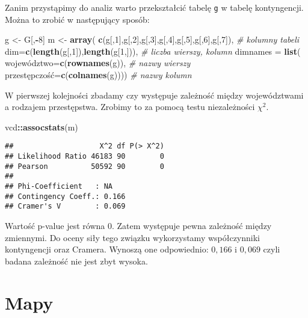 \documentclass[polish,]{book}
\newenvironment{Shaded}{\begin{snugshade}}{\end{snugshade}}
\newcommand{\CommentTok}[1]{\textcolor[rgb]{0.56,0.35,0.01}{\textit{#1}}}
\newcommand{\DataTypeTok}[1]{\textcolor[rgb]{0.13,0.29,0.53}{#1}}
\newcommand{\DecValTok}[1]{\textcolor[rgb]{0.00,0.00,0.81}{#1}}
\newcommand{\KeywordTok}[1]{\textcolor[rgb]{0.13,0.29,0.53}{\textbf{#1}}}
\newcommand{\NormalTok}[1]{#1}
\newcommand{\OperatorTok}[1]{\textcolor[rgb]{0.81,0.36,0.00}{\textbf{#1}}}
\newcommand{\StringTok}[1]{\textcolor[rgb]{0.31,0.60,0.02}{#1}}
\begin{document}
Zanim przystąpimy do analiz warto przekształcić tabelę \texttt{g} w tabelę kontyngencji.
Można to zrobić w następujący sposób:

\begin{Shaded}
\begin{Highlighting}[]
\NormalTok{g <-}\StringTok{ }\NormalTok{G[,}\OperatorTok{-}\DecValTok{8}\NormalTok{]}
\NormalTok{m <-}\StringTok{ }\KeywordTok{array}\NormalTok{(}
  \KeywordTok{c}\NormalTok{(g[,}\DecValTok{1}\NormalTok{],g[,}\DecValTok{2}\NormalTok{],g[,}\DecValTok{3}\NormalTok{],g[,}\DecValTok{4}\NormalTok{],g[,}\DecValTok{5}\NormalTok{],g[,}\DecValTok{6}\NormalTok{],g[,}\DecValTok{7}\NormalTok{]), }\CommentTok{# kolumny tabeli}
  \DataTypeTok{dim=}\KeywordTok{c}\NormalTok{(}\KeywordTok{length}\NormalTok{(g[,}\DecValTok{1}\NormalTok{]),}\KeywordTok{length}\NormalTok{(g[}\DecValTok{1}\NormalTok{,])),           }\CommentTok{# liczba wierszy, kolumn}
  \DataTypeTok{dimnames =} \KeywordTok{list}\NormalTok{(}
\NormalTok{    województwo=}\KeywordTok{c}\NormalTok{(}\KeywordTok{rownames}\NormalTok{(g)),    }\CommentTok{# nazwy wierszy}
\NormalTok{    przestępczość=}\KeywordTok{c}\NormalTok{(}\KeywordTok{colnames}\NormalTok{(g)))) }\CommentTok{# nazwy kolumn}
\end{Highlighting}
\end{Shaded}

W pierwszej kolejności zbadamy czy występuje zależność między województwami a
rodzajem przestępstwa. Zrobimy to za pomocą testu niezależności \(\chi^2\).

\begin{Shaded}
\begin{Highlighting}[]
\NormalTok{vcd}\OperatorTok{::}\KeywordTok{assocstats}\NormalTok{(m)}
\end{Highlighting}
\end{Shaded}

\begin{verbatim}
##                    X^2 df P(> X^2)
## Likelihood Ratio 46183 90        0
## Pearson          50592 90        0
## 
## Phi-Coefficient   : NA 
## Contingency Coeff.: 0.166 
## Cramer's V        : 0.069
\end{verbatim}

Wartość p-value jest równa 0. Zatem występuje pewna zależność między zmiennymi.
Do oceny siły tego związku wykorzystamy współczynniki kontyngencji oraz Cramera.
Wynoszą one odpowiednio: \(0,166\) i \(0,069\) czyli badana zależność nie jest zbyt wysoka.

\hypertarget{part_12.2}{%
\section{Mapy}\label{part_12.2}}
\end{document}
